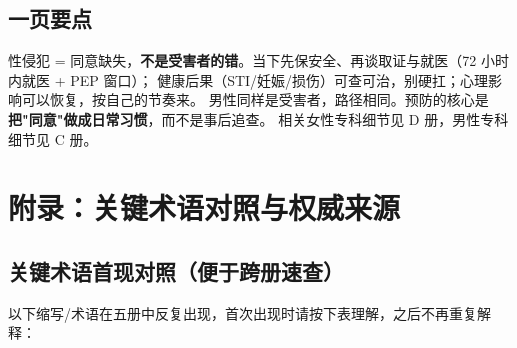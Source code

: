 \section{一页要点}
性侵犯 = 同意缺失，\textbf{不是受害者的错}。当下先保安全、再谈取证与就医（72 小时内就医 + PEP 窗口）；
健康后果（STI/妊娠/损伤）可查可治，别硬扛；心理影响可以恢复，按自己的节奏来。
男性同样是受害者，路径相同。预防的核心是\textbf{把"同意"做成日常习惯}，而不是事后追查。
相关女性专科细节见 D 册，男性专科细节见 C 册。


\chapter{附录：关键术语对照与权威来源}

\section{关键术语首现对照（便于跨册速查）}
以下缩写/术语在五册中反复出现，首次出现时请按下表理解，之后不再重复解释：

